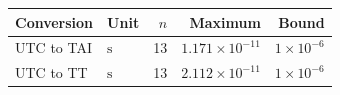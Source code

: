\begin{tabular}{@{}llrrr@{}}
\toprule
Conversion & Unit & $n$ & Maximum & Bound \\
\midrule
UTC to TAI & $\mathrm{s}$ & 13 & $1.171\times10^{-11}$ & $1\times10^{-6}$ \\
UTC to TT & $\mathrm{s}$ & 13 & $2.112\times10^{-11}$ & $1\times10^{-6}$ \\
\bottomrule
\end{tabular}
